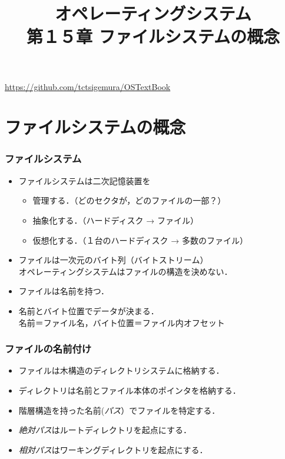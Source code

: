 \documentclass{beamer}                   %
\begin{document}
\title[主記憶]{オペレーティングシステム\\第１５章 ファイルシステムの概念}
\date{}
\begin{frame}
  \titlepage
  \centerline{\url{https://github.com/tctsigemura/OSTextBook}}
\end{frame}


\section{ファイルシステムの概念}
\begin{frame}
  \frametitle{ファイルシステム}
  \begin{itemize}
  \item ファイルシステムは二次記憶装置を
    \begin{itemize}
    \item 管理する．（どのセクタが，どのファイルの一部？）
    \item 抽象化する．（ハードディスク → ファイル）
    \item 仮想化する．（１台のハードディスク → 多数のファイル）
    \end{itemize}
  \item ファイルは一次元のバイト列（バイトストリーム） \\
    オペレーティングシステムはファイルの構造を決めない．
  \item ファイルは名前を持つ．
  \item 名前とバイト位置でデータが決まる．\\
    名前＝ファイル名，バイト位置＝ファイル内オフセット
  \end{itemize}
\end{frame}

\begin{frame}
  \frametitle{ファイルの名前付け}
  \begin{itemize}
  \item ファイルは木構造のディレクトリシステムに格納する．
  \item ディレクトリは名前とファイル本体のポインタを格納する．
  \item 階層構造を持った名前(\emph{パス}）でファイルを特定する．
  \item \emph{絶対パス}はルートディレクトリを起点にする．
  \item \emph{相対パス}はワーキングディレクトリを起点にする．
  \end{itemize}

\end{frame}
\end{document}
